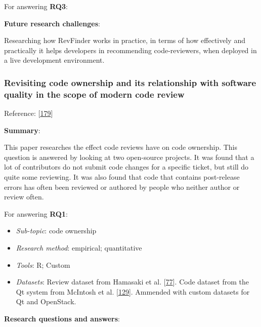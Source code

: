 \documentclass[]{book}
\providecommand{\tightlist}{%
  \setlength{\itemsep}{0pt}\setlength{\parskip}{0pt}}
\begin{document}
For answering \textbf{RQ3}:

\textbf{Future research challenges}:

Researching how RevFinder works in practice, in terms of how effectively
and practically it helps developers in recommending code-reviewers, when
deployed in a live development environment.

\subsubsection{Revisiting code ownership and its relationship with
software quality in the scope of modern code
review}\label{revisiting-code-ownership-and-its-relationship-with-software-quality-in-the-scope-of-modern-code-review}

Reference: {[}\protect\hyperlink{ref-thongtanunam2016revisiting}{179}{]}

\textbf{Summary}:

This paper researches the effect code reviews have on code ownership.
This question is answered by looking at two open-source projects. It was
found that a lot of contributors do not submit code changes for a
specific ticket, but still do quite some reviewing. It was also found
that code that contains post-release errors has often been reviewed or
authored by people who neither author or review often.

For answering \textbf{RQ1}:

\begin{itemize}
\tightlist
\item
  \emph{Sub-topic}: code ownership
\item
  \emph{Research method}: empirical; quantitative
\item
  \emph{Tools}: R; Custom
\item
  \emph{Datasets}: Review dataset from Hamasaki et al.
  {[}\protect\hyperlink{ref-hamasaki2013does}{77}{]}. Code dataset from
  the Qt system from McIntosh et al.
  {[}\protect\hyperlink{ref-mcintosh2014impact}{129}{]}. Ammended with
  custom datasets for Qt and OpenStack.
\end{itemize}

\textbf{Research questions and answers}:
\end{document}
